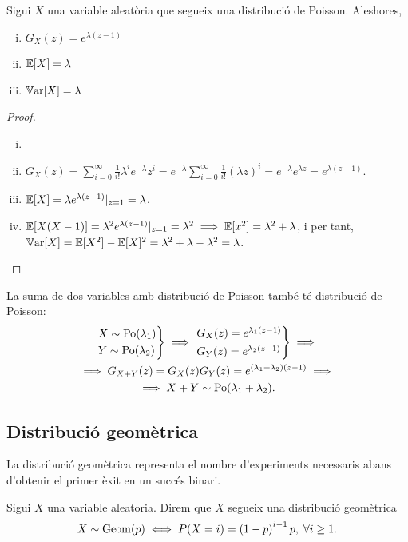 \begin{prop}
    Sigui $X$ una variable aleatòria que segueix una distribució de Poisson. Aleshores,
    \begin{enumerate}[i)]
        \item $G_X(z) = e^{\lambda(z-1)}$
        \item $\operatorname{\mathbb{E}}[X] = \lambda$
        \item $\operatorname{\mathbb{V}ar}[X] = \lambda$
    \end{enumerate}
\end{prop}

\begin{proof}
    \begin{enumerate}[i)]
        \item[]
        \item $G_X(z) = \sum\limits_{i=0}^\infty \frac{1}{i!}\lambda^i e^{-\lambda} z^i =
            e^{-\lambda} \sum\limits_{i=0}^\infty \frac{1}{i!}(\lambda z)^i = e^{-\lambda}e^{\lambda z} = e^{\lambda(z-1)}$.
        \item $\operatorname{\mathbb{E}}[X] = \lambda e^{\lambda(z-1)}|_{z=1} = \lambda$.
        \item $\operatorname{\mathbb{E}}[X(X-1)] = \lambda^2 e^{\lambda(z-1)}|_{z=1} = \lambda^2 \implies \operatorname{\mathbb{E}}[x^2] = \lambda^2+\lambda$,  i per tant, 
         $\operatorname{\mathbb{V}ar}[X] = \operatorname{\mathbb{E}}[X^2] - \operatorname{\mathbb{E}}[X]^2 = \lambda^2 + \lambda - \lambda^2 = \lambda$.
    \end{enumerate}
\end{proof}

\begin{obs} La suma de dos variables amb distribució de Poisson també té distribució de Poisson:
    \begin{gather*}
    \begin{rcases*} X \sim \operatorname{Po}(\lambda_1) \\ Y \sim \operatorname{Po}(\lambda_2) \end{rcases*} \implies
    \begin{rcases*} G_X(z) = e^{\lambda_1(z-1)} \\ G_Y(z) = e^{\lambda_2(z-1)} \end{rcases*}
    \implies \\
    \implies G_{X+Y}(z) = G_X(z)G_Y(z) = e^{(\lambda_1+\lambda_2)(z-1)} \implies \\
    \implies X+Y \sim \operatorname{Po}(\lambda_1+\lambda_2).
    \end{gather*}
\end{obs}

\subsection*{Distribució geomètrica}
La distribució geomètrica representa el nombre d'experiments necessaris abans d'obtenir el primer èxit en un succés binari.
\begin{defi}
    Sigui $X$ una variable aleatoria. Direm que $X$ segueix una distribució geomètrica
    \[X \sim \operatorname{Geom}(p) \iff P(X=i) = \left( 1-p \right) ^{i-1}p,\;\forall i\geq1.\]
\end{defi}

